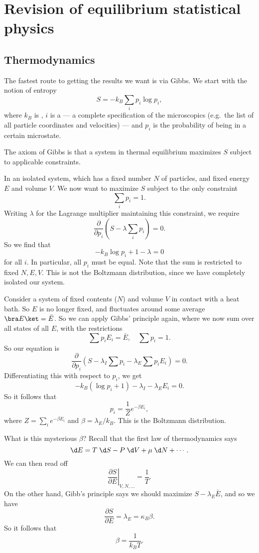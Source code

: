 \documentclass[a4paper]{article}
\begin{document}
\section{Revision of equilibrium statistical physics}
\subsection{Thermodynamics}
The fastest route to getting the results we want is via Gibbs. We start with the notion of entropy
\[
  S = - k_B \sum_i p_i \log p_i,
\]
where $k_B$ is , $i$ is a  --- a complete specification of the microscopics (e.g.\ the list of all particle coordinates and velocities) --- and $p_i$ is the probability of being in a certain microstate.

The axiom of Gibbs is that a system in thermal equilibrium maximizes $S$ subject to applicable constraints.
\begin{eg}
  In an isolated system, which has a fixed number $N$ of particles, and fixed energy $E$ and volume $V$. We now want to maximize $S$ subject to the only constraint
  \[
    \sum_i p_i = 1.
  \]
  Writing $\lambda$ for the Lagrange multiplier maintaining this constraint, we require
  \[
    \frac{\partial}{\partial p_i} \left(S - \lambda \sum_i p_i\right) = 0.
  \]
  So we find that
  \[
    -k_B \log p_i + 1 - \lambda = 0
  \]
  for all $i$. In particular, all $p_i$ must be equal. Note that the sum is restricted to fixed $N, E, V$. This is not the Boltzmann distribution, since we have completely isolated our system.
\end{eg}

\begin{eg}
  Consider a system of fixed contents ($N$) and volume $V$ in contact with a heat bath. So $E$ is no longer fixed, and fluctuates around some average $\bra E \ket = \bar{E}$. So we can apply Gibbs' principle again, where we now sum over all states of all $E$, with the restrictions
  \[
    \sum p_i E_i = \bar{E},\quad \sum p_i = 1.
  \]
  So our equation is
  \[
    \frac{\partial}{\partial p_i} \left(S - \lambda_I \sum p_i - \lambda_E \sum p_i E_i\right) = 0.
  \]
  Differentiating this with respect to $p_i$, we get
  \[
     -k_B (\log p_i + 1) - \lambda_I - \lambda_E E_i = 0.
  \]
  So it follows that
  \[
    p_i = \frac{1}{Z} e^{-\beta E_i},
  \]
  where $Z = \sum_i e^{-\beta E_i}$ and $\beta = \lambda_E/k_B$. This is the Boltzmann distribution.

  What is this mysterious $\beta$? Recall that the first law of thermodynamics says
  \[
    \d E = T\;\d S - P \;\d V + \mu \;\d N + \cdots.
  \]
  We can then read off
  \[
    \left.\frac{\partial S}{\partial E}\right|_{V, N, \ldots} = \frac{1}{T}.
  \]
  On the other hand, Gibb's principle says we should maximize $S - \lambda_E \bar{E}$, and so we have
  \[
    \frac{\partial S}{\partial E} = \lambda_E = \kappa_B \beta.
  \]
  So it follows that
  \[
    \beta = \frac{1}{k_B T}.
  \]
\end{eg}
\end{document}

